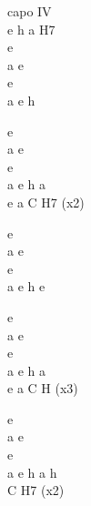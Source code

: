 \begin{chord}
\ifOneCol \else \footnotesize{ \fi
\vin capo IV\\
\OneColVin e h a H7\\
e\\ \ifOneCol \else \hfill\break \fi
a e\\
e\\
a e h

\OneColVin e\\
\OneColVin a e\\
\OneColVin e\\
\OneColVin a e h a\\
e a C H7 (x2)

e\\
a e\\
e\\
a e h e

\OneColVin e\\
\OneColVin a e\\
\OneColVin e\\
\OneColVin a e h a\\
e a C H (x3)

\OneColVin e\\
\OneColVin a e\\
\OneColVin e\\
\OneColVin a e h a h \\
C H7 (x2)
\ifOneCol \else } \fi
\end{chord}
